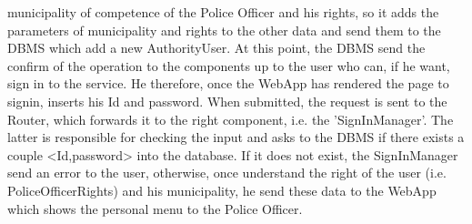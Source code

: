         municipality of competence of the Police Officer and his rights, so it
        adds the parameters of municipality and rights to the other data and
        send them to the DBMS which add a new AuthorityUser. At this point, the
        DBMS send the confirm of the operation to the components up to the user
        who can, if he want, sign in to the service. He therefore, once the
        WebApp has rendered the page to signin, inserts his Id and password.
        When submitted, the request is sent to the Router, which forwards it to
        the right component, i.e. the 'SignInManager'. The latter is responsible
        for checking the input and asks to the DBMS if there exists a couple
        <Id,password> into the database. If it does not exist, the SignInManager send
        an error to the user, otherwise, once understand the right of the user
        (i.e. PoliceOfficerRights) and his municipality, he send these data to
        the WebApp which shows the personal menu to the Police Officer. 

